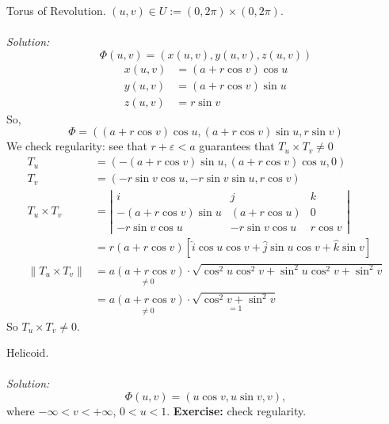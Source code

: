 \documentclass[12pt]{book}
\theoremstyle{definition}
\theoremstyle{remark}
\newcommand\sol{%
  \\ 
  \\
  \textit{Solution:}\\%
}
\begin{document}
\begin{example}Torus of Revolution. $(u,v)\in U := (0, 2 \pi)\times (0, 2\pi)$. 
  \sol 
  $$\Phi (u,v) = ( x(u,v) , y(u, v), z(u,v))$$
  \begin{equation*}
    \begin{split}  
      x(u, v) &= ( a + r \cos v ) \cos u  \\ 
      y(u,v) &= (a + r \cos v) \sin u \\ 
      z(u,v) &= r \sin v
    \end{split}
  \end{equation*}
  So, 
  $$\Phi =  (( a + r \cos v ) \cos u, (a + r \cos v) \sin u, r \sin v )$$
  We check regularity: see that $r+ \varepsilon < a $ guarantees that $T_u \times T_v  \neq 0$ 
  \begin{equation*}
    \begin{split}
      T_u &= ( -(a+ r \cos v ) \sin u , (a + r \cos v)\cos u, 0 )  \\ 
      T_v &= ( -r \sin v \cos u, - r\sin v \sin u , r \cos v  )\\ 
      T_u \times T_v & = \left| \begin{matrix}
        i& j & k \\ -(a + r\cos v ) \sin u & (a + r \cos u) & 0 \\ 
        - r \sin v \cos u & -r \sin v \cos u & r \cos v 
      \end{matrix}  \right| \\ 
      &= r( a + r \cos v )\left[ \hat{i} \cos u \cos v + \hat{j} \sin u \cos v + \hat{k} \sin v \right] \\ 
      \| T_u \times T_v \| &= \underset{\neq 0}{a( a + r \cos v )}\cdot \sqrt{ \cos^2 u \cos^2 v + \sin^2 u \cos ^2 v + \sin^2 v } \\ 
      &=  \underset{\neq 0}{a( a + r \cos v )}\cdot \underset{=1}{\sqrt{ \cos^2 v + \sin^2 v }}
    \end{split}
  \end{equation*}
  So $T_u \times T_v \neq 0$. 
\end{example}
\begin{example}
  Helicoid. 
  \sol 
  $$\Phi (u,v) = (u \cos v, u \sin v, v), $$
  where $-\infty< v < + \infty$, $0 < u< 1$. \newline \textbf{Exercise:} check regularity.
\end{example}
\end{document}

